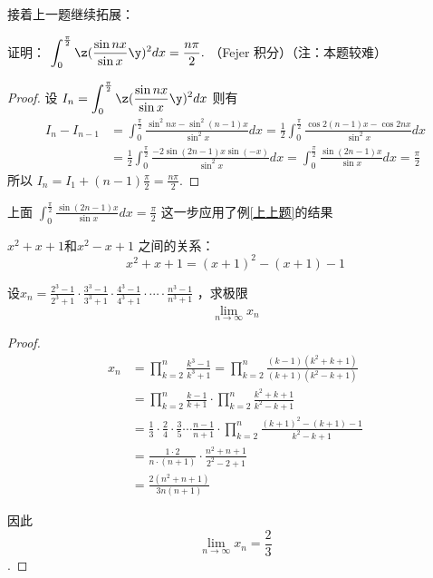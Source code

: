 接着上一题继续拓展：
\begin{example}
证明：  
\( \displaystyle \int_{0}^{\frac{\pi}{2}} \z( \frac{\sin nx}{\sin x} \y)^2 dx = \frac{n\pi}{2}.\)  
（Fejer 积分）（注：本题较难）  
\end{example}
\begin{proof}
设 \(\displaystyle  I_n = \int_{0}^{\frac{\pi}{2}} \z( \frac{\sin nx}{\sin x} \y)^2 dx \) 则有  
\begin{align*}
I_n - I_{n-1} &= \int_{0}^{\frac{\pi}{2}} \frac{\sin^2 nx - \sin^2 (n-1)x}{\sin^2 x} dx = \frac{1}{2} \int_{0}^{\frac{\pi}{2}} \frac{\cos 2(n-1)x - \cos 2nx}{\sin^2 x} dx \\
&= \frac{1}{2} \int_{0}^{\frac{\pi}{2}} \frac{-2 \sin (2n-1)x \sin (-x)}{\sin^2 x} dx = \int_{0}^{\frac{\pi}{2}} \frac{\sin (2n-1)x}{\sin x} dx = \frac{\pi}{2}
\end{align*}
所以 \( \displaystyle I_n = I_1 + (n-1) \frac{\pi}{2} = \frac{n\pi}{2} \).
\end{proof}
\begin{remark}
上面 \( \displaystyle \int_{0}^{\frac{\pi}{2}} \frac{\sin (2n-1)x}{\sin x} dx = \frac{\pi}{2}\) 这一步应用了例\ref{上上题}的结果
\end{remark}

\begin{lemma}
$ x^2+x+1 $和$ x^2-x+1 $ 之间的关系：
\[ x^2+x+1 = (x+1)^2 - (x+1) -1 \]
\end{lemma}

\begin{example}
设$x_n = \frac{2^3-1}{2^3+1}\cdot\frac{3^3-1}{3^3+1}\cdot\frac{4^3-1}{4^3+1}\cdot\cdots\cdot \frac{n^3-1}{n^3+1} $ ，求极限 \[ \lim_{n\to \infty}x_n \]
\end{example}

\begin{proof}
\begin{align*}
x_n &= \prod_{k=2}^n \frac{k^3 - 1}{k^3 + 1} = \prod_{k=2}^n \frac{(k-1)(k^2+k+1)}{(k+1)(k^2-k+1)} \\
&= \prod_{k=2}^n \frac{k-1}{k+1} \cdot \prod_{k=2}^n \frac{k^2+k+1}{k^2-k+1} \\
&= \frac{1}{3} \cdot \frac{2}{4} \cdot \frac{3}{5} \cdots \frac{n-1}{n+1} \cdot \prod_{k=2}^n \frac{(k+1)^2-(k+1)-1}{k^2-k+1} \\
&= \frac{1\cdot2}{n\cdot (n+1)} \cdot \frac{n^2+n+1}{2^2-2+1} \\
&= \frac{2(n^2+n+1)}{3n(n+1)}
\end{align*}

因此 \[\displaystyle \lim_{n\to \infty} x_n = \frac{2}{3}\].
\end{proof}

